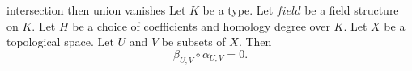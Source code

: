 \begin{cleanresult}{intersection then union vanishes}
Let $K$ be a type.
Let $\mathit{field}$ be a field structure on $K$.
Let $H$ be a choice of coefficients and homology degree over $K$.
Let $X$ be a topological space.
Let $U$ and $V$ be subsets of $X$.
Then \[\beta_{U,V} \circ \alpha_{U,V}=0.\]
\end{cleanresult}

